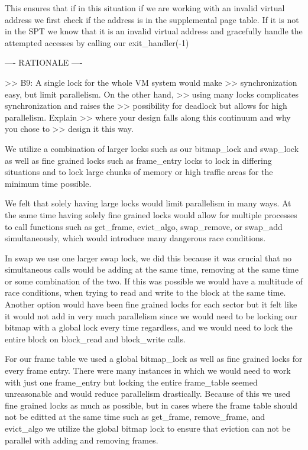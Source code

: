 This ensures that if in this situation if we are working with an invalid
virtual address we first check if the address is in the supplemental page 
table. If it is not in the SPT we know that it is an invalid virtual
address and gracefully handle the attempted accesses by
calling our exit_handler(-1)


---- RATIONALE ----

>> B9: A single lock for the whole VM system would make
>> synchronization easy, but limit parallelism.  On the other hand,
>> using many locks complicates synchronization and raises the
>> possibility for deadlock but allows for high parallelism.  Explain
>> where your design falls along this continuum and why you chose to
>> design it this way.

We utilize a combination of larger locks such as our bitmap_lock and swap_lock
as well as fine grained locks such as frame_entry locks to lock in differing
situations and to lock large chunks of memory or high traffic areas 
for the minimum time possible. 

We felt that solely having large locks would limit parallelism in many ways.
At the same time having solely fine grained locks would allow for multiple
processes to call functions such as get_frame, evict_algo, swap_remove, 
or swap_add simultaneously, which would introduce many dangerous race
conditions. 

In swap we use one larger swap lock, we did this because it was crucial that
no simultaneous calls would be adding at the same time, removing at the same
time or some combination of the two. If this was possible we would have a 
multitude of race conditions, when trying to read and write to the block
at the same time. Another option would have been fine grained locks for
each sector but it felt like it would not add in very much parallelism since
we would need to be locking our bitmap with a global lock every time 
regardless, and we would need to lock the entire block on block_read and
block_write calls.

For our frame table we used a global bitmap_lock as well as fine grained
locks for every frame entry. There were many instances in which we would
need to work with just one frame_entry but locking the entire frame_table
seemed unreasonable and would reduce parallelism drastically. Because of
this we used fine grained locks as much as possible, but in cases where
the frame table should not be editted at the same time such as get_frame,
remove_frame, and evict_algo we utilize the global bitmap lock to ensure
that eviction can not be parallel with adding and removing frames. 

